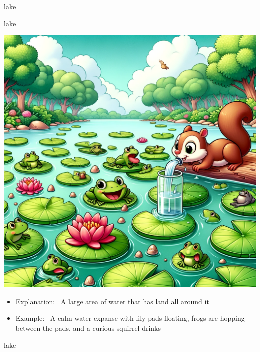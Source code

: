 \documentclass[avery5371, grid,frame]{flashcards}
\begin{document}
\begin{flashcard}{lake}
    \vspace*{\fill}
\end{flashcard}\begin{flashcard}{lake}
    \vspace*{\fill}
    \begin{center}
        \begin{minipage}[c]{.45\textwidth}
            \includegraphics[width=\textwidth]{cards/l/lake/lake - A calm water expanse with lily pads floating, frogs are hopping between the pads, and a curious squirrel drinks.png}
        \end{minipage}
        \begin{minipage}[c]{.45\textwidth}
            \begin{itemize}\setlength\itemsep{12pt}
            \item Explanation: \ A large area of water that has land all around it
            \item Example: \ A calm water expanse with lily pads floating, frogs are hopping between the pads, and a curious squirrel drinks
            \end{itemize}
        \end{minipage}
    \end{center}
    \vspace*{\fill}
\end{flashcard}\begin{flashcard}{lake}

\end{flashcard}
\end{document}

